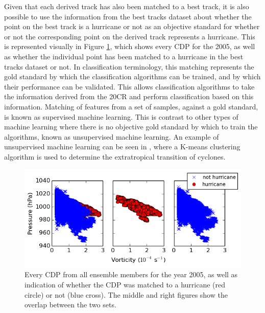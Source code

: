 \documentclass[pdftex,12pt,a4paper]{report}
\begin{document}
Given that each derived track has also been matched to a best track, it is also possible to use the
information from the best tracks dataset about whether the point on the best track is a hurricane or
not as an objective standard for whether or not the corresponding point on the derived track
represents a hurricane. This is represented visually in Figure \ref{fig:cdp_2005_with_hurrs}, which
shows every CDP for the 2005, as well as whether the individual point has been matched to a
hurricane in the best tracks dataset or not. In classification terminology, this matching represents
the gold standard by which the classification algorithms can be trained, and by which their
performance can be validated. This allows classification algorithms to take the information derived
from the 20CR and perform classification based on this information. Matching of features from a set
of samples, against a gold standard, is known as supervised machine learning. This is contrast to
other types of machine learning where there is no objective gold standard by which to train the
algorithms, known as unsupervised machine learning. An example of unsupervised machine learning can
be seen in \textcite{studholme2014objective}, where a K-means clustering algorithm is used to
determine the extratropical transition of cyclones.

\begin{figure}[hb!]
    \centering
    \includegraphics[width=\textwidth]{figures/cdp_2005_with_hurrs}
    \vspace{-10pt}
    \caption{Every CDP from all ensemble members for the year 2005, as well as indication of whether
        the CDP was matched to a hurricane (red circle) or not (blue cross). The middle and right
        figures show the overlap between the two sets.}
    \label{fig:cdp_2005_with_hurrs}
\end{figure}
\end{document}
